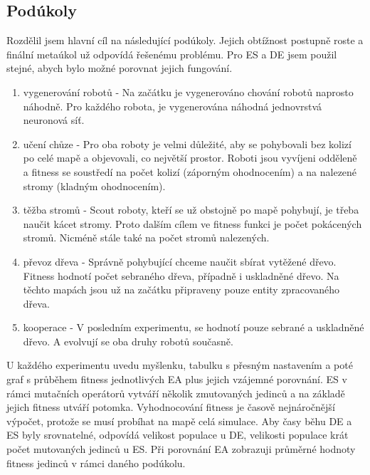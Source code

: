 \subsection*{Podúkoly} 
Rozdělil jsem hlavní cíl na následující podúkoly. Jejich obtížnost postupně roste a finální metaúkol už odpovídá řešenému problému. Pro ES a DE jsem použil stejné, abych bylo možné porovnat jejich fungování. 
\begin{enumerate}
        \item vygenerování robotů - Na začátku je vygenerováno chování robotů naprosto náhodně. Pro každého robota, je vygenerována náhodná jednovrstvá neuronová síť. 
        \item učení chůze - Pro oba roboty je velmi důležité, aby se pohybovali bez kolizí po celé mapě a objevovali, co největší prostor. Roboti jsou vyvíjeni odděleně a fitness se soustředí na počet kolizí (záporným ohodnocením) a na nalezené stromy (kladným ohodnocením).
        \item těžba stromů - Scout roboty, kteří se už obstojně po mapě pohybují, je třeba naučit kácet stromy. Proto dalším  cílem ve fitness funkci je počet pokácených stromů. Nicméně stále také na počet stromů nalezených. 
        \item převoz dřeva - Správně pohybující chceme naučit sbírat vytěžené dřevo. Fitness hodnotí počet sebraného dřeva, případně i uskladněné dřevo. Na těchto mapách jsou už na začátku připraveny pouze entity zpracovaného dřeva.
        \item kooperace - V posledním experimentu, se hodnotí pouze sebrané a uskladněné dřevo. A evolvují se oba druhy robotů současně. 
\end{enumerate}
U každého experimentu uvedu myšlenku, tabulku s přesným nastavením a poté graf s průběhem fitness jednotlivých EA plus jejich vzájemné porovnání. ES v rámci mutačních operátorů vytváří několik zmutovaných jedinců a na základě jejich fitness utváří potomka. Vyhodnocování fitness je časově nejnáročnější výpočet, protože se musí probíhat na mapě celá simulace. Aby časy běhu DE a ES byly srovnatelné, odpovídá velikost populace u DE, velikosti populace krát počet mutovaných jedinců u ES. Při porovnání EA zobrazuji průměrné hodnoty fitness jedinců v rámci daného podúkolu. 
\newpage
